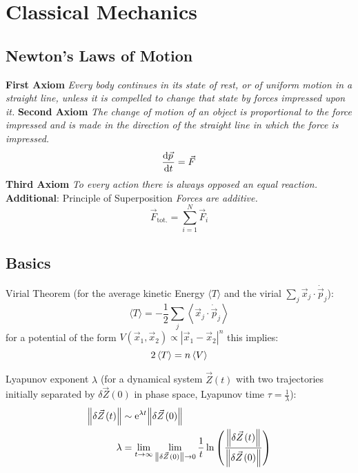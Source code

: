 \section{Classical Mechanics}
	\subsection{Newton's Laws of Motion}
		\textbf{First Axiom} \newline
		\indent \textit{Every body continues in its state of rest, or of uniform motion in a straight line, unless it is compelled to change that state by forces impressed upon it.} \nl
		\textbf{Second Axiom} \newline
		\indent \textit{The change of motion of an object is proportional to the force impressed and is made in the direction of the straight line in which the force is impressed.}
		\begin{equation}
			\dv{\vec{p}}{t} = \vec{F}
		\end{equation}\nl
		\textbf{Third Axiom} \newline
		\indent \textit{To every action there is always opposed an equal reaction.} \nl
		\textbf{Additional}: Principle of Superposition \newline
		\indent \textit{Forces are additive.}
		\begin{equation}
			\vec{F}_{\text{tot.}} = \sum_{i=1}^{N} \vec{F}_i
		\end{equation}

	\subsection{Basics}
		\noindent
		Virial Theorem (for the average kinetic Energy $\langle T \rangle$ and the virial $\sum_j \vec{x}_j\cdot\dot{\vec{p}}_j$):
		\begin{equation}
			\langle T \rangle = - \frac{1}{2} \sum_j \left\langle \vec{x}_j\cdot\dot{\vec{p}}_j \right\rangle
		\end{equation}
		for a potential of the form $V(\vec{x}_1,\vec{x}_2) \propto |\vec{x}_1-\vec{x}_2|^n$ this implies:
		\begin{equation}
			2\left\langle T \right\rangle = n\left\langle V \right\rangle
		\end{equation}

		\noindent
		Lyapunov exponent $\lambda$ (for a dynamical system $\vec{Z}(t)$ with two trajectories initially separated by $\delta\vec{Z}(0)$ in phase space, Lyapunov time $\tau=\frac{1}{\lambda}$):
		\begin{equation}
			\begin{aligned}
				\norm{\delta\vec{Z}(t)} &\sim \ex^{\lambda t} \norm{\delta\vec{Z}(0)}\\
				\lambda &= \lim_{t\to\infty} \lim_{\norm{\delta\vec{Z}(0)}\to 0} \frac{1}{t} \ln\qty(\frac{\norm{\delta \vec{Z}(t)}}{\norm{\delta\vec{Z}(0)}}) \\
			\end{aligned}
		\end{equation}

